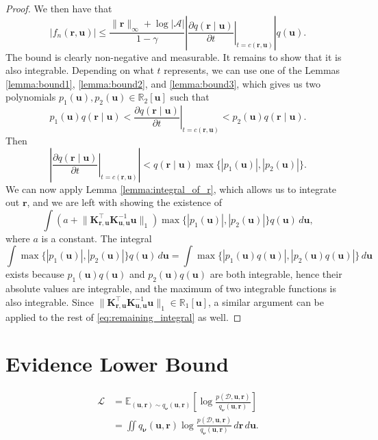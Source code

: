 \documentclass{article}
\theoremstyle{definition}
\theoremstyle{remark}
\newcommand{\Eq}{\mathbb{E}_{(\mathbf{u}, \mathbf{r}) \sim \approximation}}
\newcommand{\pfull}{p(\mathcal{D}, \mathbf{u}, \mathbf{r})}
\newcommand{\approximation}{q_{\bm\nu}(\mathbf{u}, \mathbf{r})}
\newcommand{\Kuu}{\mathbf{K}_{\mathbf{u},\mathbf{u}}}
\newcommand{\Kru}{\mathbf{K}_{\mathbf{r},\mathbf{u}}}
\newcommand{\fn}{f_n(\mathbf{r}, \mathbf{u})}
\newcommand{\dx}{\,d\mathbf{r}\,d\mathbf{u}}
\newcommand{\rinf}{\lVert \mathbf{r} \rVert_\infty}
\newcommand{\vbound}{\frac{\rinf + \log|\mathcal{A}|}{1 - \gamma}}
\begin{document}
\begin{proof}
  We then have that
  \[
    |\fn| \le \vbound \left| \left. \frac{\partial
          q(\mathbf{r} \mid \mathbf{u})}{\partial t} \right|_{t=c(\mathbf{r}, \mathbf{u})}
    \right| q(\mathbf{u}).
  \]
  The bound is clearly non-negative and measurable. It remains to show that it
  is also integrable. Depending on what $t$ represents, we can use one of the
  Lemmas \ref{lemma:bound1}, \ref{lemma:bound2}, and \ref{lemma:bound3}, which
  gives us two polynomials $p_1(\mathbf{u}), p_2(\mathbf{u}) \in
  \mathbb{R}_2[\mathbf{u}]$ such that
  \[
    p_1(\mathbf{u})q(\mathbf{r} \mid \mathbf{u}) < \left. \frac{\partial q(\mathbf{r} \mid \mathbf{u})}{\partial
        t} \right|_{t=c(\mathbf{r}, \mathbf{u})} < p_2(\mathbf{u})q(\mathbf{r} \mid \mathbf{u}).
  \]
  Then
  \[
    \left| \left. \frac{\partial q(\mathbf{r} \mid \mathbf{u})}{\partial t}
      \right|_{t=c(\mathbf{r}, \mathbf{u})} \right| < q(\mathbf{r} \mid \mathbf{u}) \max \{
    |p_1(\mathbf{u})|, |p_2(\mathbf{u})| \}.
  \]
  We can now apply Lemma \ref{lemma:integral_of_r}, which allows us to integrate
  out $\mathbf{r}$, and we are left with showing the existence of
  \begin{equation} \label{eq:remaining_integral}
    \int \left( a + \lVert \Kru^\intercal \Kuu^{-1} \mathbf{u} \rVert_1 \right) \max \{|p_1(\mathbf{u})|, |p_2(\mathbf{u})| \} q(\mathbf{u})\,d\mathbf{u},
  \end{equation}
  where $a$ is a constant. The integral
  \[
    \int \max \{|p_1(\mathbf{u})|, |p_2(\mathbf{u})| \}
    q(\mathbf{u})\,d\mathbf{u} = \int \max \{|p_1(\mathbf{u})q(\mathbf{u})|,
    |p_2(\mathbf{u})q(\mathbf{u})| \}\,d\mathbf{u}
  \]
  exists because $p_1(\mathbf{u})q(\mathbf{u})$ and
  $p_2(\mathbf{u})q(\mathbf{u})$ are both integrable, hence their absolute
  values are integrable, and the maximum of two integrable functions is also
  integrable. Since $\lVert \Kru^\intercal \Kuu^{-1} \mathbf{u} \rVert_1 \in
  \mathbb{R}_1[\mathbf{u}]$, a similar argument can be applied to the rest of
  \eqref{eq:remaining_integral} as well.
\end{proof}

\section{Evidence Lower Bound}

\begin{equation} \label{eq:elbo}
  \begin{split}
    \mathcal{L} &= \Eq \left[ \log \frac{\pfull}{\approximation}
    \right] \\
    &= \iint \approximation \log
    \frac{\pfull}{\approximation}\dx.
  \end{split}
\end{equation}
\end{document}
